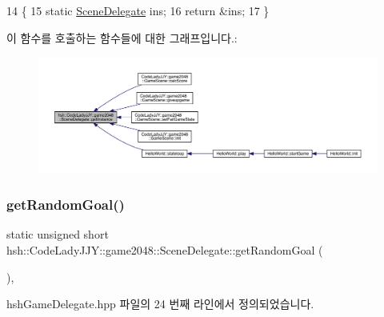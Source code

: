 \begin{DoxyCode}
14                                                    \{
15                     \textcolor{keyword}{static} \hyperlink{classhsh_1_1_code_lady_j_j_y_1_1game2048_1_1_scene_delegate_afa15a8d40890d55355083d2edfe001e0}{SceneDelegate} ins;
16                     \textcolor{keywordflow}{return} &ins;
17                 \}
\end{DoxyCode}
이 함수를 호출하는 함수들에 대한 그래프입니다.\+:
\nopagebreak
\begin{figure}[H]
\begin{center}
\leavevmode
\includegraphics[width=350pt]{d7/d4d/classhsh_1_1_code_lady_j_j_y_1_1game2048_1_1_scene_delegate_a332a574da455fb687b5d283399a6976c_icgraph}
\end{center}
\end{figure}
\mbox{\label{classhsh_1_1_code_lady_j_j_y_1_1game2048_1_1_scene_delegate_abb107cf268a50b3ebd9bd545c88a9a35}} 
\subsubsection{\texorpdfstring{get\+Random\+Goal()}{getRandomGoal()}}
{\footnotesize\ttfamily static unsigned short hsh\+::\+Code\+Lady\+J\+J\+Y\+::game2048\+::\+Scene\+Delegate\+::get\+Random\+Goal (\begin{DoxyParamCaption}{ }\end{DoxyParamCaption})\hspace{0.3cm}{\ttfamily [inline]}, {\ttfamily [static]}}



hsh\+Game\+Delegate.\+hpp 파일의 24 번째 라인에서 정의되었습니다.


